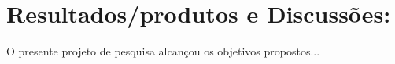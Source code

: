 \section{Resultados/produtos e Discussões:}

O presente projeto de pesquisa alcançou os objetivos propostos...

\lipsum[1-4]